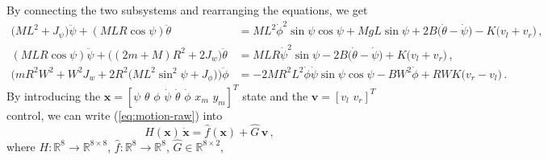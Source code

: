 \documentclass[a4paper]{article}
\newcommand{\R}{\mathbb{R}} %
\renewcommand{\vec}[1]{\mathbf{#1}} %
\newcommand{\vx}{\vec{x}}
\newcommand{\vv}{\vec{v}}
\newcommand{\hf}{\widehat{f}}
\newcommand{\hG}{\widehat{G}}
\newcommand{\pitch}{\psi}
\newcommand{\yaw}{\phi}
\newcommand{\roll}{\theta}
\begin{document}
By connecting the two subsystems and rearranging the equations, we get
\begin{equation} \begin{split}
\label{eq:motion-raw}
        \Big( M L^2 + J_\psi \Big) \ddot\pitch
      + (M L R \cos\pitch) \ddot\roll
    &=  M L^2 \dot\yaw^2 \sin\pitch \cos\pitch
      + M g L \sin\pitch
      + 2 B \big( \dot\roll - \dot\pitch \big)
      - K \big( v_l + v_r \big)
    \,, \\
        (M L R \cos\pitch) \ddot\pitch
      + \Big( (2 m + M) R^2 + 2 J_w \Big) \ddot\roll
    &=  M L R \dot\pitch^2 \sin\pitch
      - 2 B \big( \dot\roll - \dot\pitch \big)
      + K \big( v_l + v_r \big)
    \,, \\
        \Big( m R^2 W^2 + W^2 J_w
            + 2 R^2 \big( M L^2 \sin^2\pitch + J_\yaw \big)
        \Big) \ddot\yaw
    &=  -2 M R^2 L^2 \dot\yaw \dot\pitch \sin\pitch \cos\pitch
      - B W^2 \dot\yaw + R W K \big( v_r - v_l \big)
    \,.
\end{split} \end{equation}
By introducing the $\vx = [\pitch \,\, \roll \,\, \yaw \,\,
                           \dot\pitch \,\, \dot\roll \,\, \dot\yaw \,\,
                           x_m \,\, y_m]^T$ state
           and the $\vv = [v_l \,\, v_r]^T$ control,
we can write (\ref{eq:motion-raw}) into
\begin{equation}
    H(\vx) \, \dot{\vx} = \hf(\vx) + \hG \, \vv \,,
\end{equation}
where $H : \R^8 \rightarrow \R^{8 \times 8}$,
      $\hf : \R^8 \rightarrow \R^8$,
      $\hG \in \R^{8 \times 2}$,
\end{document}
